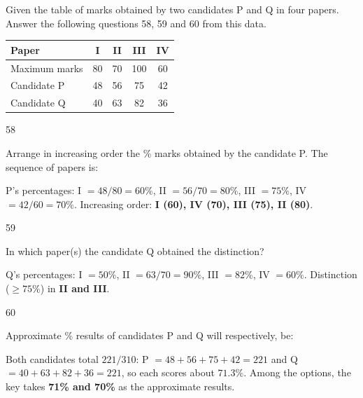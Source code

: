 \begin{context}
Given the table of marks obtained by two candidates P and Q in four papers. Answer the following questions 58, 59 and 60 from this data.
\begin{center}\small
\begin{tabular}{lcccc}\toprule \textbf{Paper} & I & II & III & IV\\\midrule
Maximum marks & 80 & 70 & 100 & 60\\ Candidate P & 48 & 56 & 75 & 42\\ Candidate Q & 40 & 63 & 82 & 36\\\bottomrule
\end{tabular}
\end{center}
\end{context}
\begin{question}{58}
{Arrange in increasing order the \% marks obtained by the candidate P. The sequence of papers is:\par}
\begin{explain}
P's percentages: I $=48/80=60\%$, II $=56/70=80\%$, III $=75\%$, IV $=42/60=70\%$.
Increasing order: \textbf{I (60), IV (70), III (75), II (80)}.
\end{explain}
\end{question}

\begin{question}{59}
{In which paper(s) the candidate Q obtained the distinction?\par}
\begin{explain}
Q's percentages: I $=50\%$, II $=63/70=90\%$, III $=82\%$, IV $=60\%$. Distinction ($\ge75\%$) in \textbf{II and III}.
\end{explain}
\end{question}

\begin{question}{60}
{Approximate \% results of candidates P and Q will respectively, be:\par}
\begin{explain}
Both candidates total $221/310$: P $=48+56+75+42=221$ and Q $=40+63+82+36=221$, so each scores about $71.3\%$. Among the options, the key takes \textbf{71\% and 70\%} as the approximate results.
\end{explain}
\end{question}
